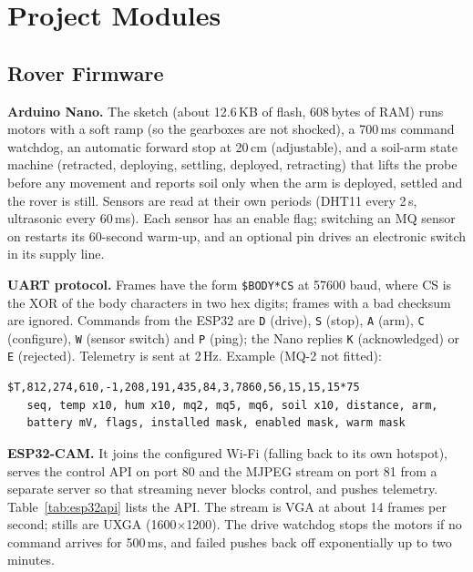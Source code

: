 \section{Project Modules}

\subsection{Rover Firmware}

\noindent\textbf{Arduino Nano.} The sketch (about 12.6\,KB of flash, 608\,bytes of RAM) runs motors with a soft ramp (so the gearboxes are not shocked), a 700\,ms
command watchdog, an automatic forward stop at 20\,cm (adjustable), and a soil-arm state machine (retracted, deploying, settling,
deployed, retracting) that lifts the probe before any movement and reports soil only when the arm is deployed, settled and the
rover is still. Sensors are read at their own periods (DHT11 every 2\,s, ultrasonic every 60\,ms). Each sensor has an enable
flag; switching an MQ sensor on restarts its 60-second warm-up, and an optional pin drives an electronic switch in its supply line.

\noindent\textbf{UART protocol.} Frames have the form \texttt{\$BODY*CS} at 57600 baud, where CS is the XOR of the body characters in two
hex digits; frames with a bad checksum are ignored. Commands from the ESP32 are \texttt{D} (drive), \texttt{S} (stop), \texttt{A} (arm),
\texttt{C} (configure), \texttt{W} (sensor switch) and \texttt{P} (ping); the Nano replies \texttt{K} (acknowledged) or \texttt{E} (rejected).
Telemetry is sent at 2\,Hz. Example (MQ-2 not fitted):

\begin{lstlisting}
$T,812,274,610,-1,208,191,435,84,3,7860,56,15,15,15*75
   seq, temp x10, hum x10, mq2, mq5, mq6, soil x10, distance, arm,
   battery mV, flags, installed mask, enabled mask, warm mask
\end{lstlisting}

\noindent\textbf{ESP32-CAM.} It joins the configured Wi-Fi (falling back to its own hotspot), serves the control API on port 80 and the
MJPEG stream on port 81 from a separate server so that streaming never blocks control, and pushes telemetry. Table~\ref{tab:esp32api}
lists the API. The stream is VGA at about 14 frames per second; stills are UXGA (1600$\times$1200). The drive watchdog stops the motors
if no command arrives for 500\,ms, and failed pushes back off exponentially up to two minutes.

